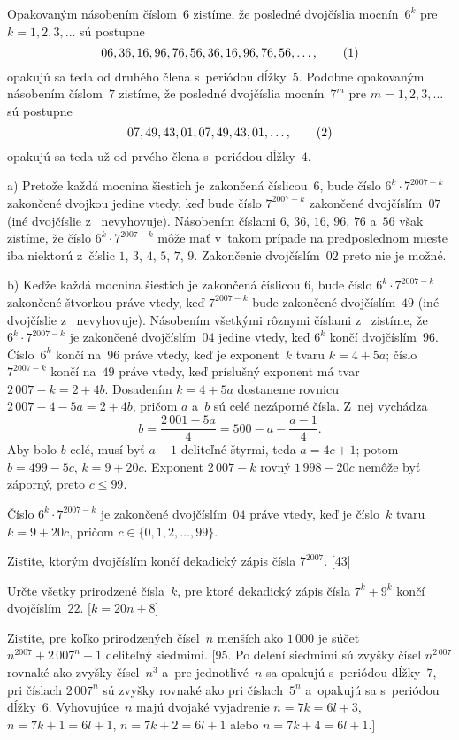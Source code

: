 {%
Opakovaným násobením číslom~$6$ zistíme, že posledné dvojčíslia
mocnín~$6^k$ pre $k=1,2,3,\dots$ sú postupne
$$
06,36,16,96,76,56,36,16,96,76,56,\dots,
\tag1
$$
opakujú sa teda od druhého člena s~periódou dĺžky~$5$. Podobne
opakovaným násobením číslom~$7$ zistíme, že posledné dvojčíslia
mocnín~$7^m$ pre $m=1,2,3,\dots$ sú postupne
$$
07,49,43,01,07,49,43,01,\dots,
\tag2
$$
opakujú sa teda už od prvého člena s~periódou dĺžky~$4$.

\smallskip
a) Pretože každá mocnina šiestich je zakončená číslicou~$6$, bude
číslo $6^k\cdot 7^{2007-k}$ zakončené dvojkou jedine vtedy,
keď bude číslo $7^{2007-k}$ zakončené dvojčíslím~$07$
(iné dvojčíslie z~ nevyhovuje). Násobením
číslami $6$, $36$, $16$, $96$, $76$ a~$56$ však zistíme, že číslo $6^k\cdot
7^{2007-k}$ môže mať v~takom prípade na predposlednom mieste iba
niektorú z~číslic $1$, $3$, $4$, $5$, $7$, $9$. Zakončenie dvojčíslím~$02$
preto nie je možné.

\smallskip
b) Keďže každá mocnina šiestich je zakončená číslicou $6$, bude
číslo $6^k\cdot 7^{2007-k}$ zakončené štvorkou práve vtedy, keď
$7^{2007-k}$ bude zakončené dvojčíslím~$49$ (iné dvojčíslie
z~ nevyhovuje). Násobením všetkými rôznymi číslami z~ zistíme,
že $6^k\cdot 7^{2007-k}$ je
zakončené dvojčíslím~$04$ jedine vtedy, keď $6^k$ končí dvojčíslím~$96$.
Číslo~$6^k$ končí na~$96$ práve vtedy, keď je exponent~$k$
tvaru $k=4+5a$; číslo $7^{2007-k}$ končí na~$49$ práve vtedy,
keď príslušný exponent má tvar $2\,007-k=2+4b$. Dosadením $k=4+5a$
dostaneme rovnicu $2\,007-4-5a=2+4b$, pričom $a$ a~$b$ sú celé
nezáporné čísla. Z~nej vychádza
$$
b=\frac{2\,001-5a}4=500-a-\frac{a-1}4.
$$
Aby bolo $b$
celé, musí byť $a-1$ deliteľné štyrmi, teda $a=4c+1$; potom
$b=499-5c$, $k=9+20c$. Exponent $2\,007-k$ rovný $1\,998-20c$
nemôže byť záporný, preto $c\le99$.

 Číslo $6^k\cdot 7^{2007-k}$ je zakončené dvojčíslím~$04$ práve vtedy,
keď je číslo~$k$ tvaru $k=9+20c$, pričom $c\in\{0, 1, 2, \dots, 99\}$.


Zistite, ktorým dvojčíslím končí dekadický zápis čísla
$7^{2007}$. [43]

Určte všetky prirodzené čísla~$k$, pre ktoré dekadický zápis
čísla $7^k+9^k$ končí dvojčíslím~$22$. [$k=20n+8$]

Zistite, pre koľko prirodzených čísel~$n$ menších ako $1\,000$
je súčet $n^{2007}+2\,007^n+1$ deliteľný siedmimi. [95.
Po delení siedmimi sú zvyšky čísel $n^{2\,007}$ rovnaké ako
zvyšky čísel~$n^3$ a~pre jednotlivé~$n$ sa opakujú s~periódou
dĺžky~$7$, pri číslach $2\,007^{n}$ sú zvyšky rovnaké ako pri číslach~$5^{n}$
a~opakujú sa s~periódou dĺžky~$6$. Vyhovujúce~$n$ majú
dvojaké vyjadrenie $n=7k=6l+3$, $n=7k+1=6l+1$, $n=7k+2=6l+1$ alebo
$n=7k+4=6l+1$.]
}

